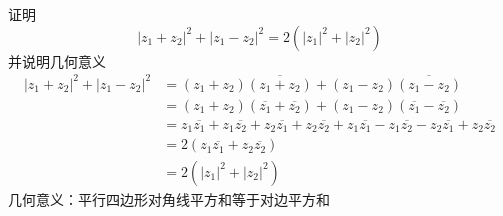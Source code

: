 \begin{homeworkProblem}
证明\[|z_1+ z_2|^2 + |z_1 - z_2|^2 = 2(|z_1|^2 + |z_2|^2)\] 并说明几何意义\newline
\solution
\[\begin{split}
|z_1+ z_2|^2 + |z_1 - z_2|^2
&= (z_1+z_2)\overline{(z_1+z_2)} + (z_1-z_2)\overline{(z_1-z_2)}\\
&=(z_1+z_2)(\overline{z_1}+\overline{z_2}) + (z_1-z_2)(\overline{z_1}-\overline{z_2})\\
&=z_1\overline{z_1} + z_1\overline{z_2} + z_2\overline{z_1} + z_2\overline{z_2} + z_1\overline{z_1}-z_1\overline{z_2}-z_2\overline{z_1} + z_2\overline{z_2} \\
&= 2(z_1\overline{z_1} + z_2\overline{z_2})\\
&= 2(|z_1|^2 + |z_2|^2)
\end{split}\]
几何意义：平行四边形对角线平方和等于对边平方和
\end{homeworkProblem}

